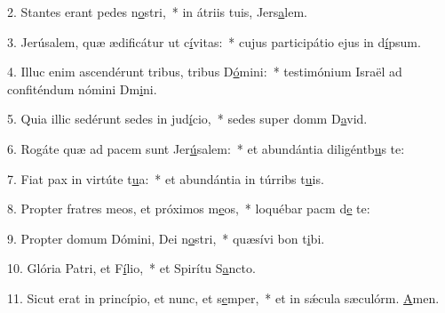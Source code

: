 2. Stantes erant pedes n\uline{o}stri,~* in átriis tuis, Jers\uline{a}lem.\par 
3. Jerúsalem, quæ ædificátur ut c\uline{í}vitas:~* cujus participátio ejus in d\uline{í}psum.\par 
4. Illuc enim ascendérunt tribus, tribus D\uline{ó}mini:~* testimónium Israël ad confiténdum nómini Dm\uline{i}ni.\par 
5. Quia illic sedérunt sedes in jud\uline{í}cio,~* sedes super domm D\uline{a}vid.\par 
6. Rogáte quæ ad pacem sunt Jer\uline{ú}salem:~* et abundántia diligéntb\uline{u}s te:\par 
7. Fiat pax in virtúte t\uline{u}a:~* et abundántia in túrribs t\uline{u}is.\par 
8. Propter fratres meos, et próximos m\uline{e}os,~* loquébar pacm d\uline{e} te:\par 
9. Propter domum Dómini, Dei n\uline{o}stri,~* quæsívi bon t\uline{i}bi.\par 
10. Glória Patri, et F\uline{í}lio,~* et Spirítu S\uline{a}ncto.\par 
11. Sicut erat in princípio, et nunc, et s\uline{e}mper,~* et in sǽcula sæculórm. \uline{A}men.\par 
